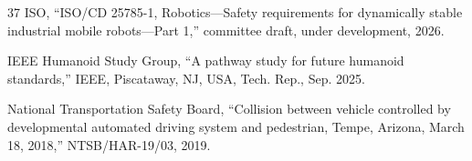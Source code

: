 \documentclass[letterpaper,9pt,conference]{ieeeconf}
\begin{document}
\begin{thebibliography}{37}
ISO, ``ISO/CD 25785-1, Robotics---Safety requirements for dynamically stable industrial mobile robots---Part 1,'' committee draft, under development, 2026.

IEEE Humanoid Study Group, ``A pathway study for future humanoid standards,'' IEEE, Piscataway, NJ, USA, Tech. Rep., Sep. 2025.

National Transportation Safety Board, ``Collision between vehicle controlled by developmental automated driving system and pedestrian, Tempe, Arizona, March 18, 2018,'' NTSB/HAR-19/03, 2019.

\end{thebibliography}
\end{document}
